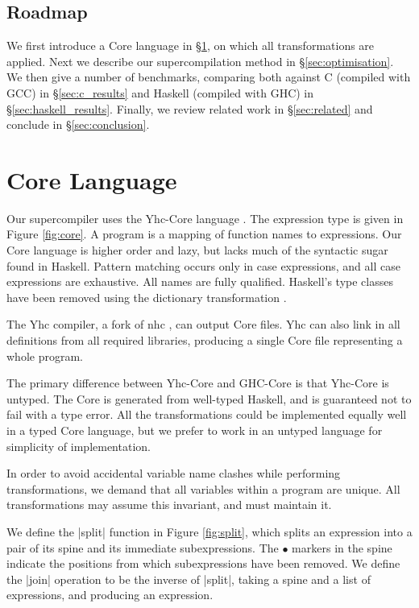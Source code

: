 \subsection{Roadmap}

We first introduce a Core language in \S\ref{sec:core}, on which all transformations are applied. Next we describe our supercompilation method in \S\ref{sec:optimisation}. We then give a number of benchmarks, comparing both against C (compiled with GCC) in \S\ref{sec:c_results} and Haskell (compiled with GHC) in \S\ref{sec:haskell_results}. Finally, we review related work in \S\ref{sec:related} and conclude in \S\ref{sec:conclusion}.

\section{Core Language}
\label{sec:core}

Our supercompiler uses the Yhc-Core language \cite{me:yhc_core}. The expression type is given in Figure \ref{fig:core}. A program is a mapping of function names to expressions. Our Core language is higher order and lazy, but lacks much of the syntactic sugar found in Haskell. Pattern matching occurs only in case expressions, and all case expressions are exhaustive. All names are fully qualified. Haskell's type classes have been removed using the dictionary transformation \cite{wadler:type_classes}.

The Yhc compiler, a fork of nhc \cite{nhc}, can output Core files. Yhc can also link in all definitions from all required libraries, producing a single Core file representing a whole program.

The primary difference between Yhc-Core and GHC-Core \cite{ghc_core} is that Yhc-Core is untyped. The Core is generated from well-typed Haskell, and is guaranteed not to fail with a type error. All the transformations could be implemented equally well in a typed Core language, but we prefer to work in an untyped language for simplicity of implementation.

In order to avoid accidental variable name clashes while performing transformations, we demand that all variables within a program are unique. All transformations may assume this invariant, and must maintain it.

We define the |split| function in Figure \ref{fig:split}, which splits an expression into a pair of its spine and its immediate subexpressions. The $\bullet$ markers in the spine indicate the positions from which subexpressions have been removed. We define the |join| operation to be the inverse of |split|, taking a spine and a list of expressions, and producing an expression.

